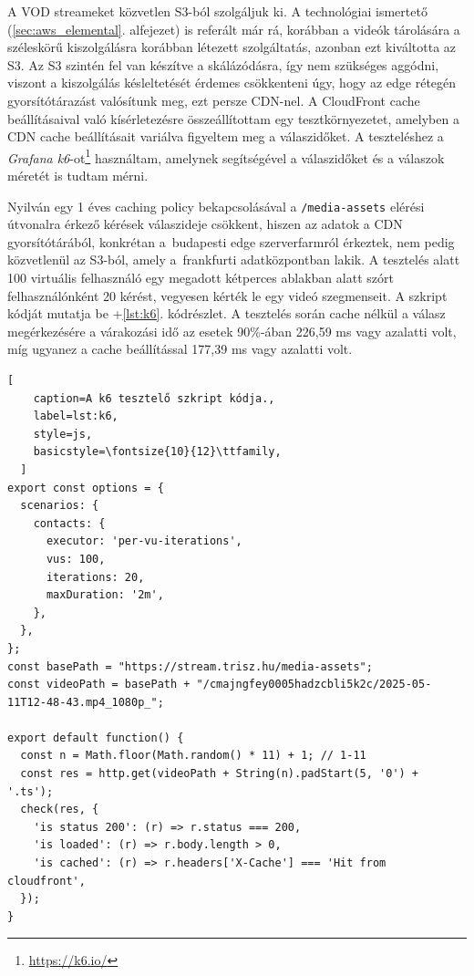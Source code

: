 A VOD streameket közvetlen S3-ból szolgáljuk ki. A technológiai ismertető (\ref{sec:aws_elemental}. alfejezet) is referált már rá, korábban a videók tárolására a széleskörű kiszolgálásra korábban létezett szolgáltatás, azonban ezt kiváltotta az S3.\cite{Mediastore} Az S3 szintén fel van készítve a skálázódásra\cite{s3perf}, így nem szükséges aggódni, viszont a kiszolgálás késleltetését érdemes csökkenteni úgy, hogy az edge rétegén gyorsítótárazást valósítunk meg, ezt persze CDN-nel. A CloudFront cache beállításaival való kísérletezésre összeállítottam egy tesztkörnyezetet, amelyben a CDN cache beállításait variálva figyeltem meg a válaszidőket. A teszteléshez a \emph{Grafana k6}-ot\footnote{\url{https://k6.io/}} használtam, amelynek segítségével a válaszidőket és a válaszok méretét is tudtam mérni.\cite{loadtests}

Nyilván egy 1 éves caching policy bekapcsolásával a \verb|/media-assets| elérési útvonalra érkező kérések válaszideje csökkent, hiszen az adatok a CDN gyorsítótárából, konkrétan a~budapesti edge szerverfarmról érkeztek, nem pedig közvetlenül az S3-ból, amely a~frankfurti adatközpontban lakik. A tesztelés alatt 100 virtuális felhasználó egy megadott kétperces ablakban alatt szórt felhasználónként 20 kérést, vegyesen kérték le egy videó szegmenseit. A szkript kódját mutatja be \az+\ref{lst:k6}. kódrészlet. A tesztelés során cache nélkül a válasz megérkezésére a várakozási idő az esetek 90\%-ában 226,59 ms vagy azalatti volt, míg ugyanez a cache beállítással 177,39 ms vagy azalatti volt.

\begin{minipage}{0.92\textwidth}
  \begin{lstlisting}[
    caption=A k6 tesztelő szkript kódja.,
    label=lst:k6,
    style=js,
    basicstyle=\fontsize{10}{12}\ttfamily,
  ]
export const options = {
  scenarios: {
    contacts: {
      executor: 'per-vu-iterations',
      vus: 100,
      iterations: 20,
      maxDuration: '2m',
    },
  },
};
const basePath = "https://stream.trisz.hu/media-assets";
const videoPath = basePath + "/cmajngfey0005hadzcbli5k2c/2025-05-11T12-48-43.mp4_1080p_";

export default function() {
  const n = Math.floor(Math.random() * 11) + 1; // 1-11
  const res = http.get(videoPath + String(n).padStart(5, '0') + '.ts');
  check(res, {
    'is status 200': (r) => r.status === 200,
    'is loaded': (r) => r.body.length > 0,
    'is cached': (r) => r.headers['X-Cache'] === 'Hit from cloudfront',
  });
}  
\end{lstlisting}
\end{minipage}
